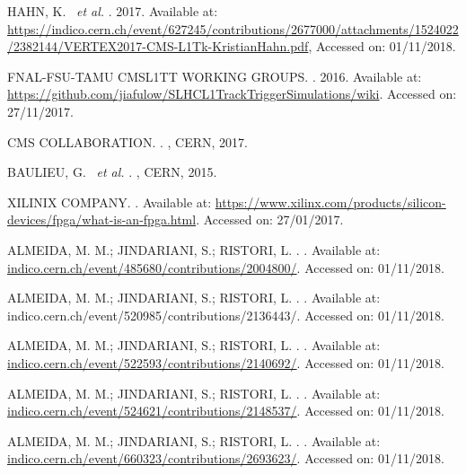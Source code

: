 \begin{thebibliography}{}
HAHN, K. ~\textit{et al.}
. 2017.
Available at: \url{https://indico.cern.ch/event/627245/contributions/2677000/attachments/1524022/2382144/VERTEX2017-CMS-L1Tk-KristianHahn.pdf},
Accessed on: 01/11/2018.

FNAL-FSU-TAMU CMSL1TT WORKING GROUPS.
. 2016.
Available at: \url{https://github.com/jiafulow/SLHCL1TrackTriggerSimulations/wiki}.
Accessed on: 27/11/2017.

CMS COLLABORATION.
.
, CERN, 2017.
	
BAULIEU, G. ~\textit{et al.}
.
, CERN, 2015.

XILINIX COMPANY.
.
Available at: \url{https://www.xilinx.com/products/silicon-devices/fpga/what-is-an-fpga.html}.
Accessed on: 27/01/2017.
	
ALMEIDA, M. M.; JINDARIANI, S.; RISTORI, L.
.
.
Available at: \url{indico.cern.ch/event/485680/contributions/2004800/}.
Accessed on: 01/11/2018.
	
ALMEIDA, M. M.; JINDARIANI, S.; RISTORI, L.
.
.
Available at: indico.cern.ch/event/520985/contributions/2136443/.
Accessed on: 01/11/2018.
	
ALMEIDA, M. M.; JINDARIANI, S.; RISTORI, L.
.
.
Available at: \url{indico.cern.ch/event/522593/contributions/2140692/}.
Accessed on: 01/11/2018.
	
ALMEIDA, M. M.; JINDARIANI, S.; RISTORI, L.
.
.
Available at: \url{indico.cern.ch/event/524621/contributions/2148537/}.
Accessed on: 01/11/2018.
	
ALMEIDA, M. M.; JINDARIANI, S.; RISTORI, L.
.
.
Available at: \url{indico.cern.ch/event/660323/contributions/2693623/}.
Accessed on: 01/11/2018.
	

\end{thebibliography}
